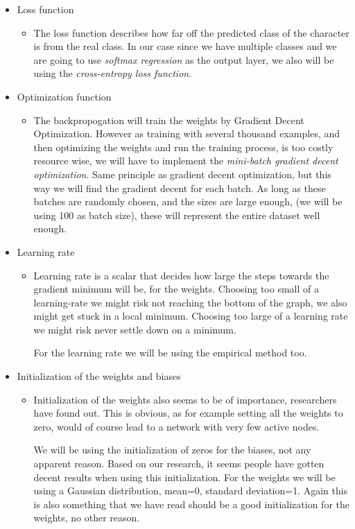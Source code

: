 \documentclass[Report.tex]{subfiles}
\begin{document}
\begin{flushleft}
\begin{itemize}
   \item{Loss function}
   \begin{itemize}
    \item{The loss function describes how far off the predicted class of the character is from the real class. In our case since we have multiple classes and we are going to use \textit{softmax regression} as the output layer, we also will be using the \textit{cross-entropy loss function}.}
   \end{itemize}
   \item{Optimization function}
   \begin{itemize}
    \item{The backpropogation will train the weights by Gradient Decent Optimization. However as training with several thousand examples, and then optimizing the weights and run the training process, is too costly resource wise, we will have to implement the \textit{mini-batch gradient decent optimization}. Same principle as gradient decent optimization, but this way we will find the gradient decent for each batch. As long as these batches are randomly chosen, and the sizes are large enough, (we will be using 100 as batch size), these will represent the entire dataset well enough.}
   \end{itemize}
   \item{Learning rate}
   \begin{itemize}
    \item{Learning rate is a scalar that decides how large the steps towards the gradient minimum will be, for the weights. Choosing too small of a learning-rate we might risk not reaching the bottom of the graph, we also might get stuck in a local minimum. Choosing too large of a learning rate we might risk never settle down on a minimum. \par
    For the learning rate we will be using the empirical method too.}
   \end{itemize}
   \item{Initialization of the weights and biases}
   \begin{itemize}
    \item{Initialization of the weights also seems to be of importance, researchers have found out. This is obvious, as for example setting all the weights to zero, would of course lead to a network with very few active nodes. \par
    We will be using the initialization of zeros for the biases, not any apparent reason. Based on our research, it seems people have gotten decent results when using this initialization. For the weights we will be using a Gaussian distribution, mean=0, standard deviation=1. Again this is also something that we have read should be a good initialization for the weights, no other reason.}

\end{itemize}
\end{itemize}
\end{flushleft}
\end{document}
